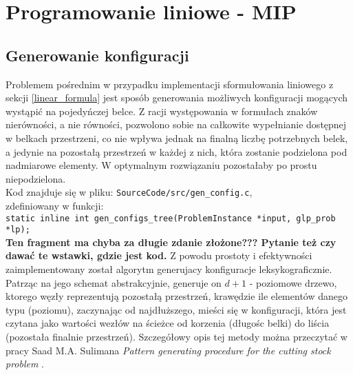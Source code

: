 \section{Programowanie liniowe - MIP}
\subsection{Generowanie konfiguracji}
Problemem pośrednim w przypadku implementacji sformułowania liniowego z sekcji \ref{linear_formula} jest sposób generowania możliwych konfiguracji mogących wystąpić na pojedyńczej belce.
Z racji występowania w formułach znaków nierówności, a nie równości, pozwolono sobie na całkowite wypełnianie dostępnej w belkach przestrzeni, co nie wpływa jednak na finalną liczbę potrzebnych belek, a jedynie na pozostałą przestrzeń w każdej z nich, która zostanie podzielona pod nadmiarowe elementy. W optymalnym rozwiązaniu pozostałaby po prostu niepodzielona.\\
Kod znajduje się w pliku: \verb|SourceCode/src/gen_config.c|,  \\ zdefiniowany w funkcji: \\ \verb|static inline int gen_configs_tree(ProblemInstance *input, glp_prob *lp);| \\
\textbf{Ten fragment ma chyba za długie zdanie złożone??? Pytanie też czy dawać te wstawki, gdzie jest kod.}
Z powodu prostoty i efektywności zaimplementowany został algorytm generujacy konfiguracje leksykograficznie. Patrząc na jego schemat abstrakcyjnie, generuje on $d + 1$ - poziomowe drzewo, ktorego węzły reprezentują pozostałą przestrzeń, krawędzie ile elementów danego typu (poziomu), zaczynając od najdłuższego, mieści się w konfiguracji, która jest czytana jako wartości wezłów na ścieżce od korzenia (długośc belki) do liścia (pozostała finalnie przestrzeń).
Szczegółowy opis tej metody można przeczytać w pracy Saad M.A. Sulimana \textit{Pattern generating procedure for the cutting stock problem} \cite{GEN_CONFIGS}. \\

